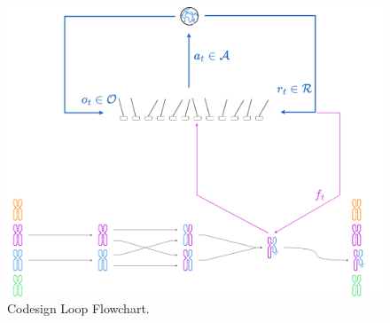 \begin{figure}
    \centering
    \caption{Codesign Loop Flowchart.}
    \label{fig:codesignloop}
    \includegraphics[width=.9\textwidth]{Images/codesign_loop.png}
\end{figure}

